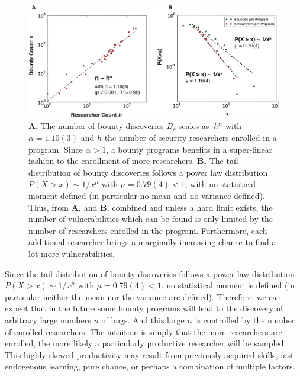 \begin{figure}[Ht]
\begin{center}
\includegraphics[width=12cm]{figures/scaling.eps}
\caption{ {\bf A.}  The number of bounty discoveries $B_c$ scales as $~h^{\alpha}$ with $\alpha = 1.10(3)$ and $h$ the number of security researchers enrolled in a program. Since $\alpha > 1$, a bounty programs benefits in a super-linear fashion to the enrollment of more researchers. {\bf B.} The tail distribution of bounty discoveries follows a power law distribution $P(X>x) \sim 1/x^\mu$  with $\mu = 0.79(4) < 1$, with no statistical moment defined (in particular no mean and no variance defined). Thus, from {\bf A.} and {\bf B.} combined and unless a hard limit exists, the number of vulnerabilities which can be found is only limited by the number of researchers enrolled in the program. Furthermore, each additional researcher brings a marginally increasing chance to find a lot more vulnerabilities.}
\label{fig:scaling}
\end{center}
\end{figure}

Since the tail distribution of bounty discoveries follows a power law distribution $P(X>x) \sim 1/x^\mu$  with $\mu = 0.79(4) < 1$, no statistical moment is defined (in particular neither the mean nor the variance are defined). Therefore, we can expect that in the future some bounty programs will lead to the discovery of arbitrary large numbers $n$ of bugs. And this large $n$ is controlled by the number of enrolled researchers: The intuition is simply that the more researchers are enrolled, the more likely a particularly productive researcher will be sampled. This highly skewed productivity may result from previously acquired skills, fast endogenous learning, pure chance, or perhaps a combination of multiple factors.
 
